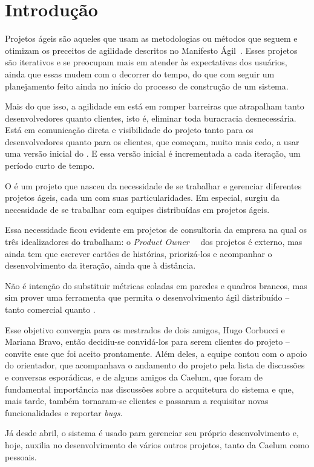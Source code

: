 \section{Introdução}
Projetos ágeis são aqueles que usam as metodologias ou métodos que seguem e otimizam os preceitos de agilidade descritos no Manifesto Ágil~\cite{manifesto}. Esses projetos são iterativos e se preocupam mais em atender às expectativas dos usuários, ainda que essas mudem com o decorrer do tempo, do que com seguir um planejamento feito ainda no início do processo de construção de um sistema.

Mais do que isso, a agilidade em está em romper barreiras que atrapalham tanto desenvolvedores quanto clientes, isto é, eliminar toda buracracia desnecessária. Está em comunicação direta e visibilidade do projeto tanto para os desenvolvedores quanto para os clientes, que começam, muito mais cedo, a usar uma versão inicial do \software{}. E essa versão inicial é incrementada a cada iteração, um período curto de tempo. 

O \calopsita{} é um projeto que nasceu da necessidade de se trabalhar e gerenciar diferentes projetos ágeis, cada um com suas particularidades. Em especial, surgiu da necessidade de se trabalhar com equipes distribuídas em projetos ágeis. 

Essa necessidade ficou evidente em projetos de consultoria da empresa na qual os três idealizadores do \calopsita{} trabalham: o \textit{Product Owner}~\cite{po}~\cite{scrum} dos projetos é externo, mas ainda tem que escrever cartões de histórias, priorizá-los e acompanhar o desenvolvimento da iteração, ainda que à distância.

Não é intenção do \calopsita{} substituir métricas coladas em paredes e quadros brancos, mas sim prover uma ferramenta que permita o desenvolvimento ágil distribuído -- tanto comercial quanto \opensource{}.  

Esse objetivo convergia para os mestrados de dois amigos, Hugo Corbucci e Mariana Bravo, então decidiu-se convidá-los para serem clientes do projeto -- convite esse que foi aceito prontamente. Além deles, a equipe contou com o apoio do orientador, que acompanhava o andamento do projeto pela lista de discussões e conversas esporádicas, e de alguns amigos da Caelum, que foram de fundamental importância nas discussões sobre a arquitetura do sistema e que, mais tarde, também tornaram-se clientes e passaram a requisitar novas funcionalidades e reportar \textit{bugs}.

Já desde abril, o sistema é usado para gerenciar seu próprio desenvolvimento e, hoje, auxilia no desenvolvimento de vários outros projetos, tanto da Caelum como pessoais. 

